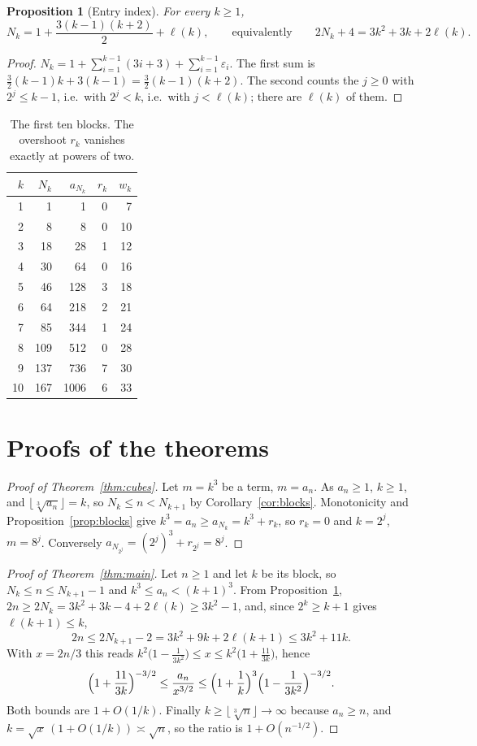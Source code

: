 \documentclass[11pt]{amsart}
\newtheorem{proposition}[theorem]{Proposition}
\theoremstyle{remark}
\newcommand{\cbrt}[1]{\bigl\lfloor\sqrt[3]{#1}\bigr\rfloor}
\begin{document}
\begin{proposition}[Entry index]\label{prop:entry}
For every $k\ge1$,
\[
  N_k=1+\frac{3(k-1)(k+2)}{2}+\ell(k),\qquad\text{equivalently}\qquad 2N_k+4=3k^2+3k+2\ell(k).
\]
\end{proposition}

\begin{proof}
$N_k=1+\sum_{i=1}^{k-1}(3i+3)+\sum_{i=1}^{k-1}\varepsilon_i$. The first sum is
$\tfrac32(k-1)k+3(k-1)=\tfrac32(k-1)(k+2)$. The second counts the $j\ge0$ with $2^j\le k-1$,
i.e.\ with $2^j<k$, i.e.\ with $j<\ell(k)$; there are $\ell(k)$ of them.
\end{proof}

\begin{table}[ht]
\centering
\begin{tabular}{rrrrr}
\toprule
$k$ & $N_k$ & $a_{N_k}$ & $r_k$ & $w_k$\\
\midrule
1 & 1 & 1 & 0 & 7\\
2 & 8 & 8 & 0 & 10\\
3 & 18 & 28 & 1 & 12\\
4 & 30 & 64 & 0 & 16\\
5 & 46 & 128 & 3 & 18\\
6 & 64 & 218 & 2 & 21\\
7 & 85 & 344 & 1 & 24\\
8 & 109 & 512 & 0 & 28\\
9 & 137 & 736 & 7 & 30\\
10 & 167 & 1006 & 6 & 33\\
\bottomrule
\end{tabular}
\caption{The first ten blocks. The overshoot $r_k$ vanishes exactly at powers of two.}
\end{table}

\section{Proofs of the theorems}

\begin{proof}[Proof of Theorem~\ref{thm:cubes}]
Let $m=k^3$ be a term, $m=a_n$. As $a_n\ge1$, $k\ge1$, and $\cbrt{a_n}=k$, so
$N_k\le n<N_{k+1}$ by Corollary~\ref{cor:blocks}. Monotonicity and Proposition~\ref{prop:blocks}
give $k^3=a_n\ge a_{N_k}=k^3+r_k$, so $r_k=0$ and $k=2^j$, $m=8^j$. Conversely
$a_{N_{2^j}}=(2^j)^3+r_{2^j}=8^j$.
\end{proof}

\begin{proof}[Proof of Theorem~\ref{thm:main}]
Let $n\ge1$ and let $k$ be its block, so $N_k\le n\le N_{k+1}-1$ and $k^3\le a_n<(k+1)^3$.
From Proposition~\ref{prop:entry}, $2n\ge 2N_k=3k^2+3k-4+2\ell(k)\ge3k^2-1$, and, since
$2^k\ge k+1$ gives $\ell(k+1)\le k$,
\[
  2n\le 2N_{k+1}-2=3k^2+9k+2\ell(k+1)\le3k^2+11k .
\]
With $x=2n/3$ this reads $k^2\bigl(1-\tfrac1{3k^2}\bigr)\le x\le k^2\bigl(1+\tfrac{11}{3k}\bigr)$, hence
\[
  \Bigl(1+\frac{11}{3k}\Bigr)^{-3/2}\le\frac{a_n}{x^{3/2}}\le
  \Bigl(1+\frac1k\Bigr)^{3}\Bigl(1-\frac1{3k^2}\Bigr)^{-3/2}.
\]
Both bounds are $1+O(1/k)$. Finally $k\ge\cbrt{n}\to\infty$ because $a_n\ge n$, and
$k=\sqrt{x}\,(1+O(1/k))\asymp\sqrt n$, so the ratio is $1+O(n^{-1/2})$.
\end{proof}
\end{document}

